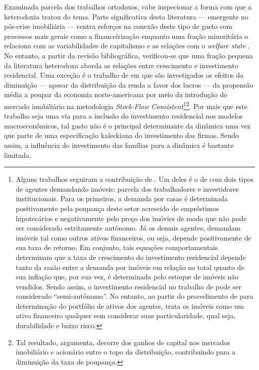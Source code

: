 Examinada parcela dos trabalhos ortodoxos, cabe inspecionar a forma com que a heterodoxia tratou do tema. 
Parte significativa desta literatura  --- emergente no pós-crise imobiliária --- centra esforços na conexão deste tipo de gasto com processos mais gerais como a financeirização \cites{aalbers_financialization_2008}{bibow_financialization_2010}
enquanto uma fração minoritária o relaciona com as variabilidades
de capitalismo e as relações com o \textit{welfare state} \cite{schwartz_politics_2009}. No
entanto, a partir da revisão bibliográfica, verificou-se que uma fração pequena da literatura heterodoxa aborda as relações entre crescimento e investimento residencial.
Uma exceção é o trabalho de \textcite{zezza_u.s._2008} em que são investigados os efeitos da diminuição --- apesar da distribuição da renda a favor dos lucros --- da propensão média a poupar da economia norte-americana por meio da introdução do mercado imobiliário na metodologia \textit{Stock-Flow Consistent}\footnote{
	Alguns trabalhos seguiram a contribuição de \textcite{zezza_u.s._2008}.
	Um deles é o de \textcite{nikolaidi_securitisation_2015} com dois tipos de agentes demandando imóveis: parcela dos trabalhadores e investidores institucionais.
	Para os primeiros, a demanda por casas é determinada positivamente pela poupança deste setor acrescido de empréstimos hipotecários e negativamente pelo preço dos imóvies de modo que não pode ser considerado estritamente autônomo.
	Já os demais agentes, demandam imóveis tal como outros ativos financeiros, ou seja, depende positivamente de sua taxa de retorno.
	Em conjunto, tais equações comportamentais determinam que a taxa de crescimento do investimento residencial depende tanto da razão entre a demanda por imóveis em relação ao total quanto de sua inflação que, por sua vez, é determinada pelo estoque de imóveis não vendidos.
	Sendo assim, o investimento residencial no trabalho de \textcite{nikolaidi_securitisation_2015} pode ser considerado ``semi-autônomo''.
	No entanto, ao partir do procedimento de \textcite{godley_money_1999} para determinação do portfólio de ativos dos agentes, trata os imóveis como um ativo financeiro qualquer sem considerar suas particularidade, qual seja, durabilidade e baixo risco.
}\footnote{
	Tal resultado, argumenta, decorre dos ganhos de capital nos mercados imobiliário e acionário entre o topo da distribuição, contribuindo para a diminuição da taxa de poupança.
}. 
Por mais que este trabalho seja uma via para a inclusão do investimento residencial nos modelos macroeconômicos, tal gasto não é o principal determinante da dinâmica uma vez que parte de uma especificação kaleckiana do investimento das firmas.
Sendo assim, a influência do investimento das famílias para a dinâmica é bastante limitada.

